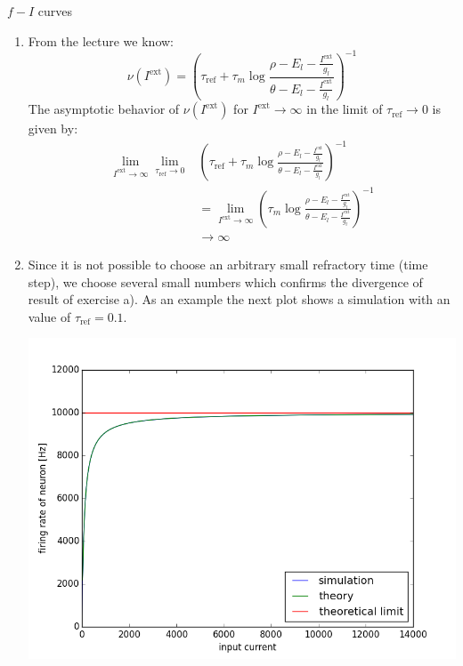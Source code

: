 \documentclass[12pt]{article}
\newenvironment{exercise}[2][Exercise]{\begin{trivlist}
\item[\hskip \labelsep {\bfseries #1}\hskip \labelsep {\bfseries #2.}]}{\end{trivlist}}
\begin{document}
\begin{exercise}{4.2}
$f-I$ curves \\
\renewcommand{\labelenumi}{\alph{enumi})}
\begin{enumerate}
\item From the lecture we know:
  \begin{equation}
    \nu(I^{\text{ext}}) = \left(\tau_{\text{ref}} + \tau_m \log{\frac{\rho - E_l - \frac{I^{\text{ext}}}{g_l}}{\theta - E_l - \frac{I^{\text{ext}}}{g_l}}}\right)^{-1}
  \end{equation}
  The asymptotic behavior of $\nu(I^{\text{ext}})$ for $I^{\text{ext}}\rightarrow \infty$ in the limit of $\tau_{\text{ref}}\rightarrow 0$ is given by:
  \begin{align}
    \lim_{I^{\text{ext}}\rightarrow \infty} \lim_{\tau_{\text{ref}}\rightarrow 0} &\left(\tau_{\text{ref}} + \tau_m \log{\frac{\rho - E_l - \frac{I^{\text{ext}}}{g_l}}{\theta - E_l - \frac{I^{\text{ext}}}{g_l}}}\right)^{-1} \\
                                                                                  &=\lim_{I^{\text{ext}}\rightarrow \infty}\left(\tau_m \log{\frac{\rho - E_l - \frac{I^{\text{ext}}}{g_l}}{\theta - E_l - \frac{I^{\text{ext}}}{g_l}}}\right)^{-1} \\
                                                                                  &\rightarrow \infty
  \end{align}
\item Since it is not possible to choose an arbitrary small refractory time (time step), we choose several small numbers which confirms the divergence of result of exercise a). As an example the next plot shows a simulation with an value of $\tau_{\text{ref}}=0.1$.

\includegraphics[width=5.2in]{codes/excercise2_01}


\end{enumerate}
\end{exercise}
\end{document}
